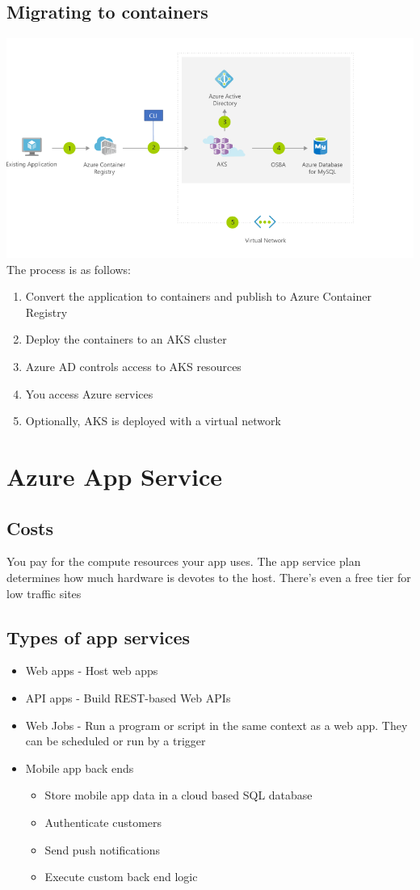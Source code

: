 \documentclass{article}[18pt]
\begin{document}
\subsection{Migrating to containers}
\includegraphics[width=15cm]{4-kub-migration}
The process is as follows:
\begin{enumerate}
	\item Convert the application to containers and publish to Azure Container Registry
	\item Deploy the containers to an AKS cluster
	\item Azure AD controls access to AKS resources
	\item You access Azure services
	\item Optionally, AKS is deployed with a virtual network
\end{enumerate}
\section{Azure App Service}
\subsection{Costs}
You pay for the compute resources your app uses. The app service plan determines how much hardware is devotes to the host. There's even a free tier for low traffic sites
\subsection{Types of app services}
\begin{itemize}
	\item Web apps - Host web apps
	\item API apps - Build REST-based Web APIs
	\item Web Jobs - Run a program or script in the same context as a web app. They can be scheduled or run by a trigger
	\item Mobile app back ends
	\begin{itemize}
		\item Store mobile app data in a cloud based SQL database
		\item Authenticate customers
		\item Send push notifications
		\item Execute custom back end logic
	\end{itemize}
\end{itemize}
\end{document}
